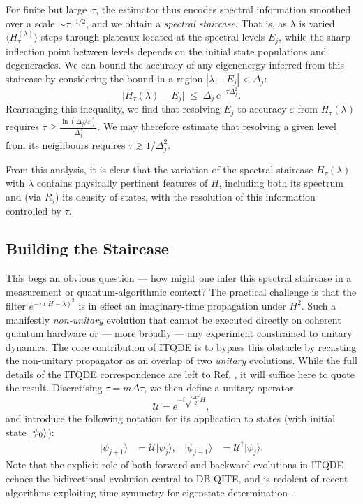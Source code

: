 \documentclass[reprint, aps,prx,showpacs,bibfootnote,preprintnumbers, mathtools, superscriptaddress, amsmath,amssymb]{revtex4-2}
\begin{document}
For finite but large~$\tau$, the estimator thus encodes spectral information smoothed over a scale $\sim\tau^{-1/2}$, and we obtain a \textit{spectral staircase}. That is, as $\lambda$ is varied $ \langle H_\tau^{(\lambda)}\rangle$ steps through plateaux located at the spectral levels $E_j$, while the sharp inflection point between levels depends on the initial state populations and degeneracies. We can bound the accuracy of any eigenenergy inferred from this staircase by considering the bound in a region $|\lambda-E_j|<\Delta_j$:
\begin{equation}
  \bigl|H_\tau (\lambda)- E_j\bigr|
  \;\le\;
  \Delta_j\,e^{-\tau \Delta_j^{2}}.
  \label{eq:uniform_bound}
\end{equation}
Rearranging this inequality, we find that resolving $E_j$ to accuracy $\varepsilon$ from $H_\tau(\lambda)$ requires $\tau\geq
  \frac{\ln(\Delta_j/\varepsilon)}{\Delta_j^2}$. We may therefore estimate that resolving a given level from its neighbours requires $\tau\gtrsim1/\Delta_j^{2}$.

From this analysis, it is clear that the variation of the spectral staircase $H_\tau (\lambda)$ with $\lambda$ contains physically pertinent features of $H$, including both its spectrum and (via $R_j$) its density of states, with the resolution of this information controlled by $\tau$.

\subsection*{Building the Staircase}
This begs an obvious question — how might one infer this spectral staircase in a measurement or quantum-algorithmic context? The practical challenge is that the filter $e^{-\tau(H-\lambda)^2}$ is in effect an imaginary-time propagation under $H^2$. Such a manifestly \emph{non-unitary} evolution that cannot be executed directly on coherent quantum hardware or — more broadly — any experiment constrained to unitary dynamics. The core contribution of ITQDE is to bypass this obstacle by recasting the non-unitary propagator as an overlap of two \emph{unitary} evolutions. While the full details of the ITQDE correspondence are left to Ref. \cite{leamer_quantum_2024}, it will suffice here to quote the result. Discretising $\tau=m\Delta\tau$, we then define a unitary operator
\begin{equation}
	\mathcal{U} = e^{-i\sqrt{\frac{\Delta\tau}{2}}H},
 \label{eq:U}
\end{equation}
and introduce the following notation for its application to states (with initial state $\ket{\psi_0}$):
\begin{align}
	|\psi_{j+1}\rangle &= {\mathcal{U}}|\psi_j\rangle,  & |\psi_{j-1}\rangle &= {\mathcal{U}}^\dag|\psi_j\rangle.
\end{align}
Note that the explicit role of both forward and backward evolutions in ITQDE echoes the bidirectional evolution central to DB-QITE, and is redolent of recent algorithms exploiting time symmetry for eigenstate determination \cite{wei_time-symmetric_2025}.
\end{document}
